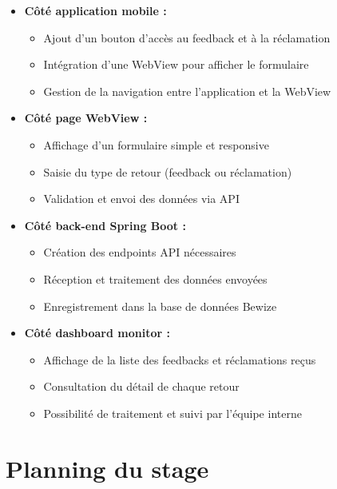 \begin{itemize}
    \item \textbf{Côté application mobile :}
    \begin{itemize}
        \item Ajout d'un bouton d'accès au feedback et à la réclamation
        \item Intégration d'une WebView pour afficher le formulaire
        \item Gestion de la navigation entre l'application et la WebView
    \end{itemize}
    
    \item \textbf{Côté page WebView :}
    \begin{itemize}
        \item Affichage d'un formulaire simple et responsive
        \item Saisie du type de retour (feedback ou réclamation)
        \item Validation et envoi des données via API
    \end{itemize}
    
    \item \textbf{Côté back-end Spring Boot :}
    \begin{itemize}
        \item Création des endpoints API nécessaires
        \item Réception et traitement des données envoyées
        \item Enregistrement dans la base de données Bewize
    \end{itemize}
    
    \item \textbf{Côté dashboard monitor :}
    \begin{itemize}
        \item Affichage de la liste des feedbacks et réclamations reçus
        \item Consultation du détail de chaque retour
        \item Possibilité de traitement et suivi par l'équipe interne
    \end{itemize}
\end{itemize}

\section{Planning du stage}

